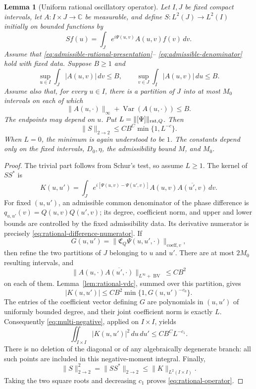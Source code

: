 \documentclass[11pt]{article}
\numberwithin{equation}{section}
\newtheorem{lemma}[theorem]{Lemma}
\theoremstyle{remark}
\theoremstyle{definition}
\newcommand{\Var}{\operatorname{Var}}
\newcommand{\norm}[1]{\lVert #1\rVert}
\newcommand{\BV}{\operatorname{BV}}
\begin{document}
\begin{lemma}[Uniform rational oscillatory operator]
\label{lem:rational-operator}
Let $I,J$ be fixed compact intervals, let $A:I\times J\to\mathbb C$ be
measurable, and define $S:L^2(J)\to L^2(I)$ initially on bounded functions
by
\[
 Sf(u)=\int_J e^{i\Psi(u,v)}A(u,v)f(v)\,dv.
\]
Assume that \eqref{eq:admissible-rational-presentation}--
\eqref{eq:admissible-denominator} hold with fixed data.  Suppose $B\ge1$
and
\[
 \sup_{u\in I}\int_J|A(u,v)|\,dv\le B,\qquad
 \sup_{v\in J}\int_I|A(u,v)|\,du\le B.
\]
Assume also that, for every $u\in I$, there is a partition of $J$ into at
most $M_0$ intervals on each of which
\[
 \norm{A(u,\cdot)}_\infty+\Var(A(u,\cdot))\le B.
\]
The endpoints may depend on $u$.  Put
$L=\norm{[\Psi]}_{{\rm rat},Q}$.  Then
\begin{equation}\label{eq:rational-operator}
 \norm S_{2\to2}\le CB^C\min\{1,L^{-c}\}.
\end{equation}
When \(L=0\), the minimum is again understood to be \(1\).
The constants depend only on the fixed intervals, $D_0,\eta$, the
admissibility bound $M$, and $M_0$.
\end{lemma}

\begin{proof}
The trivial part follows from Schur's test, so assume $L\ge1$.  The kernel
of $SS^*$ is
\[
 K(u,u')=\int_J e^{i[\Psi(u,v)-\Psi(u',v)]}
 A(u,v)\overline{A(u',v)}\,dv.
\]
For fixed $(u,u')$, an admissible common denominator of the phase
difference is $q_{u,u'}(v)=Q(u,v)Q(u',v)$; its degree, coefficient norm,
and upper and lower bounds are controlled by the fixed admissibility data.
Its derivative numerator is precisely
\eqref{eq:rational-difference-numerator}.  If
\[
 G(u,u')=\norm{\mathfrak C_Q\Psi(u,u',\cdot)}_{\mathrm{coeff},v},
\]
then refine the two partitions of $J$ belonging to $u$ and $u'$.
There are at most $2M_0$ resulting intervals, and
\[
 \norm{A(u,\cdot)\overline{A(u',\cdot)}}_{L^\infty+\BV}
 \le CB^2
\]
on each of them.  Lemma~\ref{lem:rational-vdc}, summed over this
partition, gives
\begin{equation}\label{eq:rational-K-pointwise}
 |K(u,u')|\le CB^2\min\{1,G(u,u')^{-c_0}\}.
\end{equation}
The entries of the coefficient vector defining $G$ are polynomials in
$(u,u')$ of uniformly bounded degree, and their joint coefficient norm is
exactly $L$.  Consequently \eqref{eq:multi-negative}, applied on
$I\times I$, yields
\[
 \iint_{I\times I}|K(u,u')|^2\,du\,du'
 \le CB^C L^{-c_1}.
\]
There is no deletion of the diagonal or of any algebraically degenerate
branch: all such points are included in this negative-moment integral.
Finally,
\[
 \norm S_{2\to2}^2=\norm{SS^*}_{2\to2}
 \le\norm K_{L^2(I\times I)}.
\]
Taking the two square roots and decreasing $c_1$ proves
\eqref{eq:rational-operator}.
\end{proof}
\end{document}
